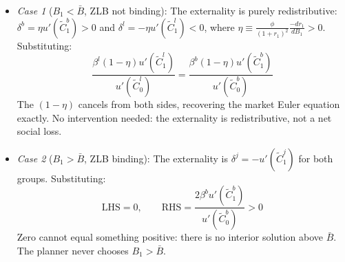 \documentclass[11pt,a4paper]{article}
\begin{document}
\begin{itemize}
    \item \textit{Case 1} ($B_1 < \bar{B}$, ZLB not binding): The externality is purely redistributive: $\delta^b = \eta u'(\tilde{C}_1^b) > 0$ and $\delta^l = -\eta u'(\tilde{C}_1^l) < 0$, where $\eta \equiv \frac{\phi}{(1+r_1)^2}\frac{-dr_1}{dB_1} > 0$. Substituting:
    \begin{equation}
    \frac{\beta^l(1-\eta)u'(\tilde{C}_1^l)}{u'(\tilde{C}_0^l)} = \frac{\beta^b(1-\eta)u'(\tilde{C}_1^b)}{u'(\tilde{C}_0^b)}
    \end{equation}
    The $(1-\eta)$ cancels from both sides, recovering the market Euler equation exactly. No intervention needed: the externality is redistributive, not a net social loss.

    \item \textit{Case 2} ($B_1 > \bar{B}$, ZLB binding): The externality is $\delta^j = -u'(\tilde{C}_1^j)$ for both groups. Substituting:
    \begin{equation}
    \text{LHS} = 0, \qquad \text{RHS} = \frac{2\beta^b u'(\tilde{C}_1^b)}{u'(\tilde{C}_0^b)} > 0
    \end{equation}
    Zero cannot equal something positive: there is no interior solution above $\bar{B}$. The planner never chooses $B_1 > \bar{B}$.


\end{itemize}
\end{document}

